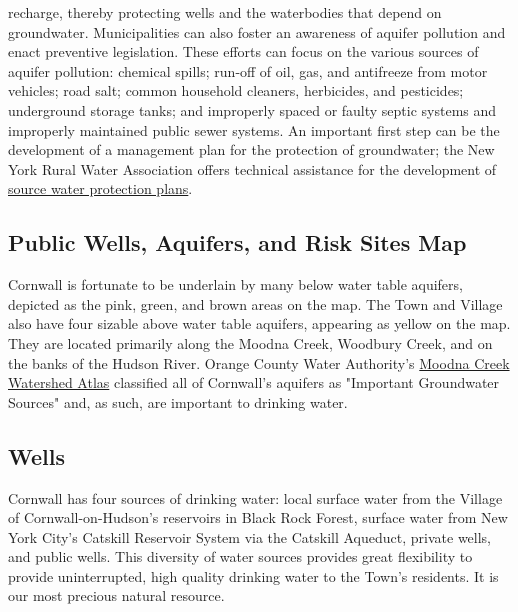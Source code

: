 recharge, thereby protecting wells and the waterbodies that depend on 
groundwater. Municipalities can also foster an awareness of aquifer pollution 
and enact preventive legislation. These efforts can focus on the various sources 
of aquifer pollution: chemical spills; run-off of oil, gas, and antifreeze from 
motor vehicles; road salt; common household cleaners, herbicides, and 
pesticides; underground storage tanks; and improperly spaced or faulty septic 
systems and improperly maintained public sewer systems. An important first step 
can be the development of a management plan for the protection of groundwater; 
the New York Rural Water Association offers technical assistance for the 
development of \href{ 
http://www.nyruralwater.org/sites/default/files/Fact\%20Sheet10\_1-5-2018.pdf}{ 
source water protection plans}.

\subsection*{Public Wells, Aquifers, and Risk Sites Map}
Cornwall is fortunate to be underlain by many below water table aquifers, 
depicted as the pink, green, and brown areas on the map. The Town and Village 
also have four sizable above water table aquifers, appearing as yellow on the 
map. They are located primarily along the Moodna Creek, Woodbury Creek, and on 
the banks of the Hudson River. Orange County Water Authority's 
\href{
http://www.kj-seqra.com/507Acres/ReferenceMaterial/OCWA\%202008\%20Moodna\%20Wat
ershed\%20Atlas\%20(39MB).pdf}{Moodna Creek Watershed Atlas} classified all of 
Cornwall’s aquifers as "Important Groundwater Sources" and, as such, are 
important to drinking water.


\label{map:wells}

\subsection*{Wells}\label{subsec:wells}
Cornwall has four sources of drinking water: local surface water from the 
Village of Cornwall-on-Hudson’s reservoirs in Black Rock Forest, surface water 
from New York City’s Catskill Reservoir System via the Catskill Aqueduct, 
private wells, and public wells. This diversity of water sources provides great 
flexibility to provide uninterrupted, high quality drinking water to the Town’s 
residents. It is our most precious natural resource.

